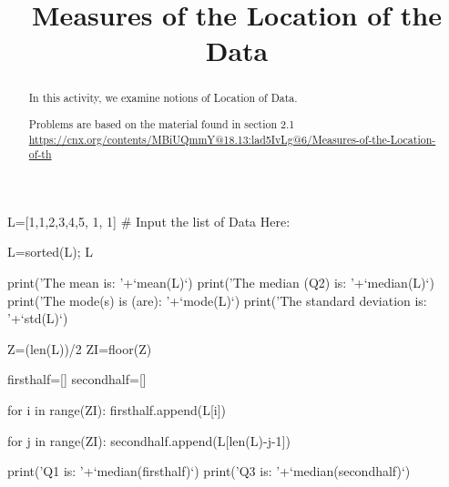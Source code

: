\documentclass{ximera}
\title{Measures of the Location of the Data}
\begin{document}
      
\begin{abstract}
      
In this activity, we examine notions of Location of Data.

Problems are based on the material found in section 2.1 \url{https://cnx.org/contents/MBiUQmmY@18.13:lad5IvLg@6/Measures-of-the-Location-of-th}
      
\end{abstract}
      
\maketitle
 
 \begin{sageCell}
L=[1,1,2,3,4,5, 1, 1] # Input the list of Data Here:

L=sorted(L); L


print('The mean is: '+`mean(L)`)
print('The median (Q2) is: '+`median(L)`)
print('The mode(s) is (are): '+`mode(L)`)
print('The standard deviation is: '+`std(L)`)

Z=(len(L))/2
ZI=floor(Z)

firsthalf=[]
secondhalf=[]

for i in range(ZI):
    firsthalf.append(L[i])

    
for j in range(ZI):
    secondhalf.append(L[len(L)-j-1])


print('Q1 is: '+`median(firsthalf)`)
print('Q3 is: '+`median(secondhalf)`)
\end{sageCell} 
     
\end{document}
